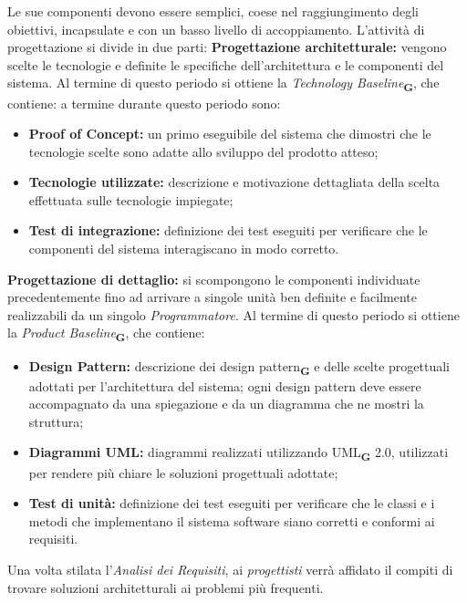 Le sue componenti devono essere semplici, coese nel raggiungimento degli obiettivi, incapsulate e con un basso livello di accoppiamento.
\label{Periodi della progettazione}
L'attività di progettazione si divide in due parti:
\textbf{Progettazione architetturale:} vengono scelte le tecnologie e definite le specifiche dell'architettura e le componenti del sistema. Al termine di questo periodo
si ottiene la \textit{Technology Baseline}\textsubscript{\textbf{G}}, che contiene:
a termine durante questo periodo sono:
\begin{itemize}
    \item \textbf{Proof of Concept:} un primo eseguibile del sistema che dimostri che le tecnologie scelte sono adatte allo sviluppo del prodotto atteso;
    \item \textbf{Tecnologie utilizzate:} descrizione e motivazione dettagliata della scelta effettuata sulle tecnologie impiegate;
    \item \textbf{Test di integrazione:} definizione dei test eseguiti per verificare che le componenti del sistema interagiscano in modo corretto.
\end{itemize}
\textbf{Progettazione di dettaglio:} si scompongono le componenti individuate precedentemente fino ad
arrivare a singole unità ben definite e facilmente realizzabili da un singolo \textit{Programmatore}. Al termine di questo periodo si
ottiene la \textit{Product Baseline}\textsubscript{\textbf{G}}, che contiene:
\begin{itemize}
    \item \textbf{Design Pattern:} descrizione dei design pattern\textsubscript{\textbf{G}} e delle scelte progettuali adottati per l'architettura del sistema; ogni design pattern deve essere accompagnato da una spiegazione e
          da un diagramma che ne mostri la struttura;
    \item \textbf{Diagrammi UML:} diagrammi realizzati utilizzando UML\textsubscript{\textbf{G}} 2.0, utilizzati per rendere più chiare le soluzioni progettuali adottate;
    \item \textbf{Test di unità:} definizione dei test eseguiti per verificare che le classi e i metodi che implementano il sistema software siano corretti e conformi ai requisiti.
\end{itemize}
Una volta stilata l'\textit{Analisi dei Requisiti}, ai \textit{progettisti} verrà affidato il compiti di trovare soluzioni architetturali ai problemi più frequenti.
